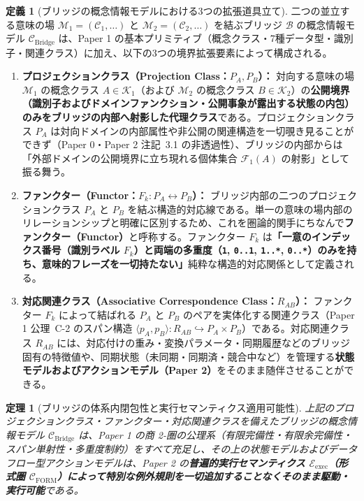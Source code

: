 \documentclass[11pt,a4paper]{ltjsarticle}
\theoremstyle{definition}
\newtheorem{definition}{定義}[section]
\theoremstyle{plain}
\newtheorem{theorem}{定理}[section]
\theoremstyle{remark}
\newcommand{\CFORM}{\mathcal{C}_{\mathrm{FORM}}}
\newcommand{\CBridge}{\mathcal{C}_{\mathrm{Bridge}}}
\newcommand{\Eexec}{\mathcal{E}_{\mathrm{exec}}}
\begin{document}
\begin{definition}[ブリッジの概念情報モデルにおける3つの拡張道具立て]\label{def:bridge-primitives}
二つの並立する意味の場 $\mathcal{M}_1 = (\mathcal{C}_1, \dots)$ と $\mathcal{M}_2 = (\mathcal{C}_2, \dots)$ を結ぶブリッジ $\mathcal{B}$ の概念情報モデル $\CBridge$ は、Paper 1 の基本プリミティブ（概念クラス・7種データ型・識別子・関連クラス）に加え、以下の3つの境界拡張要素によって構成される。

\begin{enumerate}
    \item \textbf{プロジェクションクラス（Projection Class：$P_A, P_B$）：}
    対向する意味の場 $\mathcal{M}_1$ の概念クラス $A \in \mathcal{K}_1$（および $\mathcal{M}_2$ の概念クラス $B \in \mathcal{K}_2$）の\textbf{公開境界（識別子およびドメインファンクション・公開事象が露出する状態の内包）のみをブリッジの内部へ射影した代理クラス}である。プロジェクションクラス $P_A$ は対向ドメインの内部属性や非公開の関連構造を一切覗き見ることができず（Paper 0・Paper 2 注記~3.1 の非透過性）、ブリッジの内部からは「外部ドメインの公開境界に立ち現れる個体集合 $\mathcal{F}_1(A)$ の射影」として振る舞う。
    \item \textbf{ファンクター（Functor：$F_k : P_A \leftrightarrow P_B$）：}
    ブリッジ内部の二つのプロジェクションクラス $P_A$ と $P_B$ を結ぶ構造的対応線である。単一の意味の場内部のリレーションシップと明確に区別するため、これを圏論的関手にちなんで\textbf{ファンクター（Functor）}と呼称する。ファンクター $F_k$ は\textbf{「一意のインデックス番号（識別ラベル $F_k$）と両端の多重度（\texttt{1}, \texttt{0..1}, \texttt{1..*}, \texttt{0..*}）のみを持ち、意味的フレーズを一切持たない」}純粋な構造的対応関係として定義される。
    \item \textbf{対応関連クラス（Associative Correspondence Class：$R_{AB}$）：}
    ファンクター $F_k$ によって結ばれる $P_A$ と $P_B$ のペアを実体化する関連クラス（Paper 1 公理~C-2 のスパン構造 $\langle p_A, p_B \rangle : R_{AB} \hookrightarrow P_A \times P_B$）である。対応関連クラス $R_{AB}$ には、対応付けの重み・変換パラメータ・同期履歴などのブリッジ固有の特徴値や、同期状態（未同期・同期済・競合中など）を管理する\textbf{状態モデルおよびアクションモデル（Paper 2）}をそのまま随伴させることができる。
\end{enumerate}
\end{definition}

\begin{theorem}[ブリッジの体系内閉包性と実行セマンティクス適用可能性]\label{thm:bridge-closure}
上記のプロジェクションクラス・ファンクター・対応関連クラスを備えたブリッジの概念情報モデル $\CBridge$ は、Paper 1 の商 2-圏の公理系（有限完備性・有限余完備性・スパン単射性・多重度制約）をすべて充足し、その上の状態モデルおよびデータフロー型アクションモデルは、Paper 2 の\textbf{普遍的実行セマンティクス $\Eexec$（形式圏 $\CFORM$）によって特別な例外規則を一切追加することなくそのまま駆動・実行可能}である。
\end{theorem}
\end{document}
